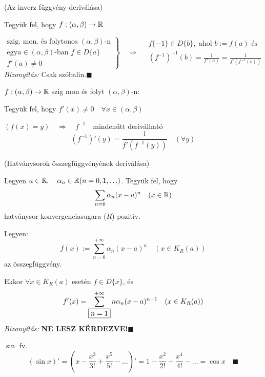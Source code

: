 \documentclass[a4paper,11.5pt]{article}
\begin{document}
	\begin{figure}[H]
		\centering
		\caption{}\label{}
	\end{figure}
	\begin{theorem}
		(Az inverz függvény deriválása)
		
		Tegyük fel, hogy $f:(\alpha,\beta)\to\mathbb{R}$
		
		$\left.\begin{gathered}
			\text{szig. mon. és folytonos }
			(\alpha,\beta)\text{-n}\\
			\text{egy} a\in(\alpha,\beta)\text{-ban } f\in D\{a\}\\
			f'(a)\not=0 
		\end{gathered}\right\}\quad \Rightarrow\quad \begin{gathered}
		f\{-1\}\in D\{b\}, \text{ ahol } b:=f(a)\text{ és}\\
		(f^{-1})^{-1}(b)=\frac{1}{f'(a)}=\frac{1}{f'(f^{-1}(b))}
		\end{gathered}$
		\textit{Bizonyítás:} Csak szóbalin.\quad $\blacksquare$
	\end{theorem}
	\begin{note}
		$f:(\alpha,\beta)\to\mathbb{R}$ szig mon és folyt $(\alpha
		,\beta)$-n:
		
		Tegyük fel, hogy $f'(x)\not=0\quad \forall x\in(\alpha,\beta)$
		
		$(f(x)=y)\quad \Rightarrow\quad f^{-1}\quad $mindenütt deriválható
		\[ (f^{-1})'(y)=\frac{1}{f'(f^{-1}(y))}\quad (\forall y) \]
		\begin{center}
			\fbox{$\displaystyle (f^{-1})'=\frac{1}{f\circ f^{-1}}$}
		\end{center}
	\end{note}
	\begin{theorem}
		(Hatványsorok összegfüggvényének deriválása)
		
		Legyen $a\in\mathbb{R},\quad \alpha_n\in\mathbb{R}(n=0,1,\ldots)$. Tegyük fel, hogy
		\[ \sum_{n=0}\alpha_n(x-a)^n\quad (x\in\mathbb{R}) \]
		hatványsor konvergenciasugara ($R$) pozitív.
		
		Legyen:
		\[ f(x):=\sum_{n=0}^{+\infty}\alpha_n(x-a)^n\quad (x\in K_R(a)) \]
		az összegfüggvény.
		
		Ekkor $\forall x\in K_R(a)$ esetén $f\in D\{x\}$, és 
		\[ f'(x)=\sum_{\fbox{$n=1$}}^{+\infty} n\alpha_n(x-a)^{n-1}\quad (x\in K_R(a)) \]
		\textit{Bizonyítás:} \textbf{NE LESZ KÉRDEZVE!}\quad $\blacksquare$
	\end{theorem}
	\begin{example}
		$\sin$ fv.
		\[ (\sin x)'= \left(x-\frac{x^3}{3!}+\frac{x^5}{5!}-\ldots\right)' = 1-\frac{x^2}{2!}+\frac{x^4}{4!}-\ldots=\cos x\quad \blacksquare \]
	\end{example}
\end{document}
